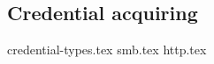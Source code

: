 \documentclass{article}
\begin{document}
\subsection{Credential acquiring}

{credential-types.tex}
{smb.tex}
{http.tex}
\end{document}
